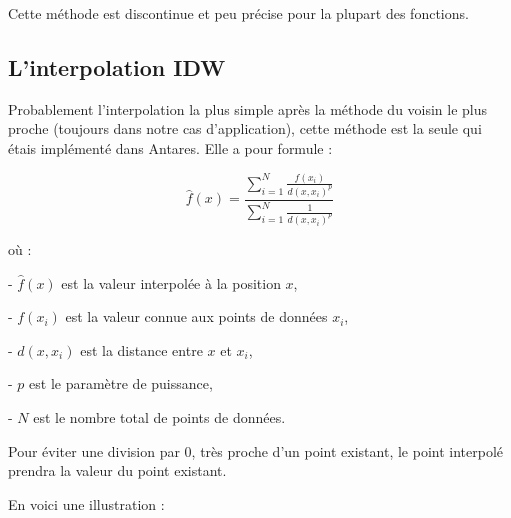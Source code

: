 \vspace{0.5cm}

Cette méthode est discontinue et peu précise pour la plupart des fonctions.



\subsection{L'interpolation \ac{IDW}} %

Probablement l'interpolation la plus simple après la méthode du voisin le plus proche (toujours dans notre cas d'application), cette méthode est la seule qui étais implémenté dans Antares. Elle a pour formule :

\[
\hat{f}(x) = \frac{\sum_{i=1}^{N} \frac{f(x_i)}{d(x, x_i)^p}}{\sum_{i=1}^{N} \frac{1}{d(x, x_i)^p}}
\]

où :

- \(\hat{f}(x)\) est la valeur interpolée à la position \(x\),

- \(f(x_i)\) est la valeur connue aux points de données \(x_i\),

- \(d(x, x_i)\) est la distance entre \(x\) et \(x_i\),

- \(p\) est le paramètre de puissance,

- \(N\) est le nombre total de points de données.

Pour éviter une division par 0, très proche d'un point existant, le point interpolé prendra la valeur du point existant.
\vspace*{0,5cm}

En voici une illustration :

\vspace{0.5cm}

